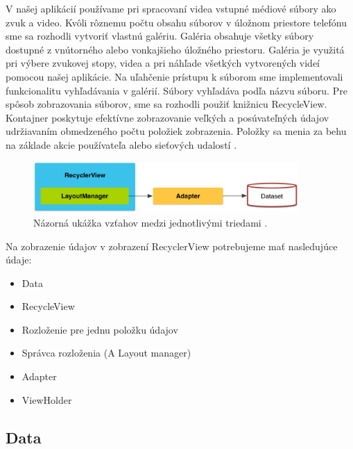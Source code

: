\documentclass[12pt, oneside]{book}
\begin{document}
\hspace{15pt} V našej aplikácií používame pri spracovaní videa vstupné médiové súbory ako zvuk a video. Kvôli rôznemu počtu obsahu súborov v úložnom priestore telefónu sme sa rozhodli vytvoriť vlastnú galériu. Galéria obsahuje všetky súbory dostupné z vnútorného alebo vonkajšieho úložného priestoru. Galéria je využitá pri výbere zvukovej stopy, videa a pri náhľade všetkých vytvorených videí pomocou našej aplikácie. Na uľahčenie prístupu k súborom sme implementovali funkcionalitu vyhľadávania v galérií. Súbory vyhľadáva podľa názvu súboru. 
\hspace{15pt} Pre spôsob zobrazovania súborov, sme sa rozhodli použiť knižnicu RecycleView. Kontajner poskytuje efektívne zobrazovanie veľkých a posúvateľných údajov udržiavaním obmedzeného počtu položiek zobrazenia. Položky sa menia za behu na základe akcie používateľa alebo sieťových udalostí \cite{recycleView2}.

\begin{figure}[h]
    \centering
    \includegraphics[width=0.9\textwidth]{images/RecyclerView.png}
    \caption{Názorná ukážka vzťahov medzi jednotlivými triedami \cite{recycleView}. }
    \label{fig:obr05}
\end{figure}


Na zobrazenie údajov v zobrazení RecyclerView potrebujeme mať nasledujúce údaje:
\begin{itemize}
    \item Data
    \item RecycleView
    \item Rozloženie pre jednu položku údajov
    \item Správca rozloženia (A Layout manager)
    \item Adapter
    \item ViewHolder
\end{itemize}

\subsection{Data}
\label{sec:data}
\end{document}
